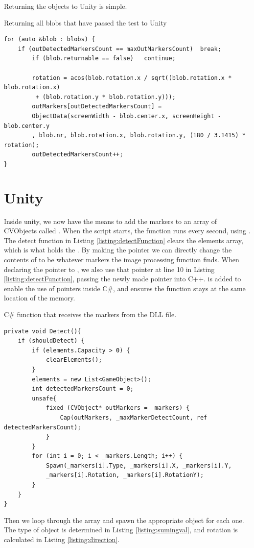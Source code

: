 Returning the objects to Unity is simple. 
 \begin{listing}[H]
	\caption{Returning all blobs that have passed the test to Unity}
	\begin{verbatim}
for (auto &blob : blobs) {
	if (outDetectedMarkersCount == maxOutMarkersCount)	break;
		if (blob.returnable == false)	continue;
		
		rotation = acos(blob.rotation.x / sqrt((blob.rotation.x * blob.rotation.x)
		 + (blob.rotation.y * blob.rotation.y)));
		outMarkers[outDetectedMarkersCount] = 
		ObjectData(screenWidth - blob.center.x, screenHeight - blob.center.y
		, blob.nr, blob.rotation.x, blob.rotation.y, (180 / 3.1415) * rotation);
		outDetectedMarkersCount++;
}
	\end{verbatim}
	\label{listing:return}
\end{listing}


\section{Unity}
 Inside unity, we now have the means to add the markers to an array of CVObjects called . When the script starts, the  function runs every second, using . The detect function in Listing \ref{listing:detectFunction} clears the elements array, which is what holds the . By making the pointer  we can directly change the contents of  to be whatever markers the image processing function finds. When declaring the pointer to , we also use that pointer at line 10 in Listing \ref{listing:detectFunction}, passing the newly made pointer into C++.  is added to enable the use of pointers inside C\#, and  ensures the function stays at the same location of the memory.
	\begin{listing}[H]
		\caption{C\# function that receives the markers from the DLL file.}
		\begin{verbatim}
private void Detect(){
	if (shouldDetect) {
		if (elements.Capacity > 0) {
			clearElements();
		}
		elements = new List<GameObject>();
		int detectedMarkersCount = 0;
		unsafe{
			fixed (CVObject* outMarkers = _markers) {
				Cap(outMarkers, _maxMarkerDetectCount, ref detectedMarkersCount);
			}
		}
		for (int i = 0; i < _markers.Length; i++) {
			Spawn(_markers[i].Type, _markers[i].X, _markers[i].Y,
			_markers[i].Rotation, _markers[i].RotationY);
		}
	}
}
	\end{verbatim}
\label{listing:detectFunction}
\end{listing}
Then we loop through the  array and spawn the appropriate object for each one. The type of object is determined in Listing \ref{listing:sumingval}, and rotation is calculated in Listing \ref{listing:direction}.\\

